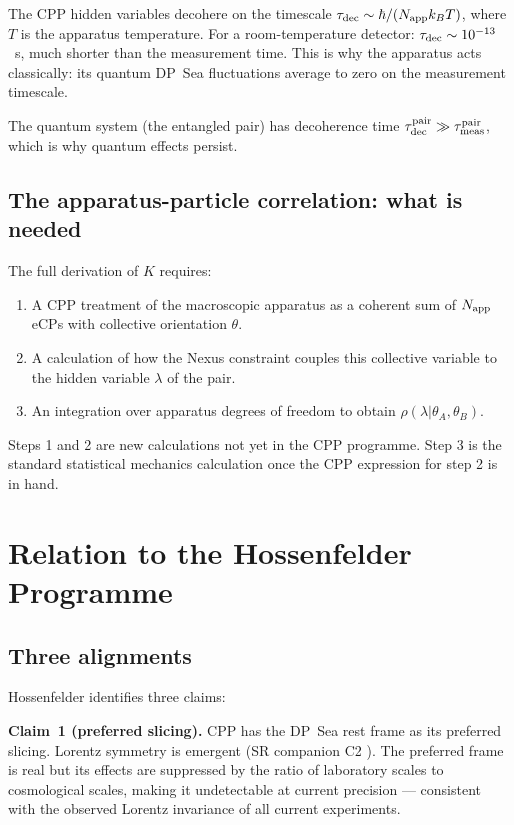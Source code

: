 \documentclass[11pt,a4paper]{article}
\begin{document}
The CPP hidden variables decohere on the timescale $\tau_{\rm dec}
\sim \hbar / (N_{\rm app} k_B T)$, where $T$ is the apparatus
temperature.  For a room-temperature detector: $\tau_{\rm dec} \sim
10^{-13}$~s, much shorter than the measurement time.  This is why
the apparatus acts classically: its quantum DP~Sea fluctuations
average to zero on the measurement timescale.

The quantum system (the entangled pair) has decoherence time
$\tau_{\rm dec}^{\rm pair} \gg \tau_{\rm meas}^{\rm pair}$, which is
why quantum effects persist.

\subsection{The apparatus-particle correlation: what is needed}

The full derivation of $K$ requires:
\begin{enumerate}
\item A CPP treatment of the macroscopic apparatus as a coherent
  sum of $N_{\rm app}$ eCPs with collective orientation $\theta$.
\item A calculation of how the Nexus constraint couples this
  collective variable to the hidden variable $\lambda$ of the pair.
\item An integration over apparatus degrees of freedom to obtain
  $\rho(\lambda | \theta_A, \theta_B)$.
\end{enumerate}

Steps 1 and 2 are new calculations not yet in the CPP programme.
Step 3 is the standard statistical mechanics calculation once the
CPP expression for step 2 is in hand.

\section{Relation to the Hossenfelder Programme}
\label{sec:hossenfelder}

\subsection{Three alignments}

Hossenfelder identifies three claims:

\textbf{Claim~1 (preferred slicing).}
CPP has the DP~Sea rest frame as its preferred slicing.
Lorentz symmetry is emergent (SR companion C2 \citep{abshier_sr}).
The preferred frame is real but its effects are suppressed by the
ratio of laboratory scales to cosmological scales, making it
undetectable at current precision --- consistent with the observed
Lorentz invariance of all current experiments.
\end{document}
